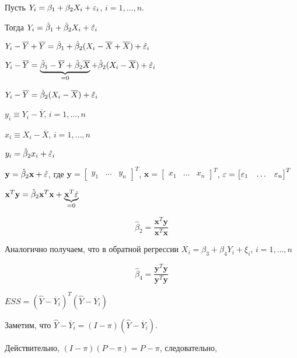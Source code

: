 \documentclass[pdftex,11pt,openany]{book}\usepackage[]{graphicx}\usepackage[]{color}
\begin{document}
\begin{solution}
Пусть $Y_i = \beta_1 + \beta_2 X_i + \varepsilon_i$, $i = 1, \ldots, n$.

Тогда $Y_i = \hat{\beta}_1 + \hat{\beta}_2 X_i + \hat{\varepsilon}_i$

$Y_i -  \overline{Y} + \overline{Y} = \hat{\beta}_1 + \hat{\beta}_2 (X_i -  \overline{X} + \overline{X}) + \hat{\varepsilon}_i$

$Y_i -  \overline{Y}  = \underbrace{\hat{\beta}_1 - \overline{Y} + \hat{\beta}_2 \overline{X}}_{=0} + \hat{\beta}_2 (X_i -  \overline{X}) + \hat{\varepsilon}_i$

$Y_i -  \overline{Y} = \hat{\beta}_2 (X_i -  \overline{X}) + \hat{\varepsilon}_i$

$y_i \equiv Y_i -  \overline{Y}$, $i = 1, \ldots, n$

$x_i \equiv X_i -  \overline{X}$, $i = 1, \ldots, n$

$y_i = \hat{\beta}_2 x_i + \hat{\varepsilon}_i$

$\textbf{y} = \hat{\beta}_2 \textbf{x} + \hat{\varepsilon}$, где $\textbf{y} = \begin{bmatrix}
y_1 & \ldots & y_n
\end{bmatrix}^T$, $\textbf{x} = \begin{bmatrix}
x_1 & \ldots & x_n
\end{bmatrix}^T$, $\varepsilon = \begin{bmatrix}
\varepsilon_1 & \ldots & \varepsilon_n
\end{bmatrix}^T$

$\textbf{x}^T \textbf{y} = \hat{\beta}_2 \textbf{x}^T \textbf{x} + \underbrace{\textbf{x}^T \hat{\varepsilon}}_{=0}$

\begin{equation}
\label{task20:direct_ols}\hat{\beta}_2 = \frac{\textbf{x}^T \textbf{y}}{\textbf{x}^T \textbf{x}}
\end{equation}

Аналогично получаем, что в обратной регрессии $X_i = \beta_3 + \beta_4 Y_i + \xi_i$, $i = 1, \ldots, n$

\begin{equation}
\label{task20:reverse_ols}\hat{\beta}_4 = \frac{\textbf{y}^T \textbf{y}}{\textbf{y}^T \textbf{y}}
\end{equation}

$ESS = (\hat{Y} - \overline{Y}_i)^T(\hat{Y} - \overline{Y}_i)$

Заметим, что $\hat{Y} - \overline{Y}_i = (I - \pi)(\hat{Y} - \overline{Y}_i)$.

Действительно, $(I - \pi)(P - \pi) = P - \pi$, следовательно,


\end{solution}
\end{document}
